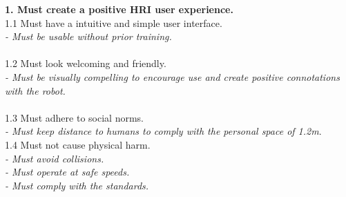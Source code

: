 \newpage

\textbf{1. Must create a positive HRI user experience.}\\
\hspace*{3mm} 1.1 Must have a intuitive and simple user interface.\\
\hspace*{9mm}\textit{ - Must be usable without prior training.}\\
\\
\hspace*{3mm} 1.2 Must look welcoming and friendly.\\
\hspace*{9mm}\textit{ - Must be visually compelling to encourage use and create positive connotations \hspace*{13mm}with the robot.}\\
\\
\hspace*{3mm} 1.3 Must adhere to social norms.\\
\hspace*{9mm}\textit{ - Must keep distance to humans to comply with the personal space of 1.2m}.\\
        
\hspace*{3mm} 1.4 Must not cause physical harm.\\
\hspace*{9mm}\textit{- Must avoid collisions.}\\
\hspace*{9mm}\textit{- Must operate at safe speeds.}\\
\hspace*{9mm}\textit{- Must comply with the standards.}\\

